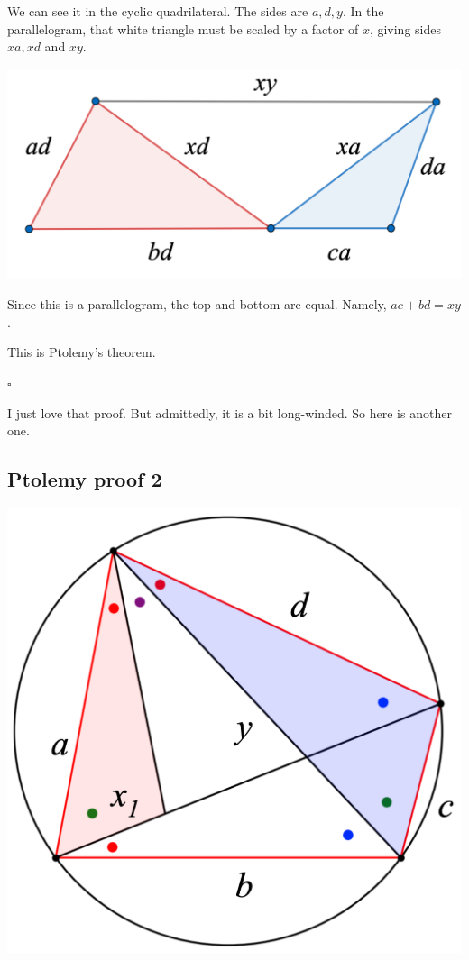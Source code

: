 \documentclass[11pt, oneside]{article}
\begin{document}
We can see it in the cyclic quadrilateral.  The sides are $a,d,y$.  In the parallelogram, that white triangle must be scaled by a factor of $x$, giving sides $xa, xd $ and $xy$.
\begin{center} \includegraphics [scale=0.2] {Ptol13.png} \end{center}

Since this is a parallelogram, the top and bottom are equal.  Namely, $ac + bd = xy$.

This is Ptolemy's theorem.

$\square$

I just love that proof.  But admittedly, it is a bit long-winded.  So here is another one.

\subsection*{Ptolemy proof 2}

\begin{center} \includegraphics [scale=0.25] {ptolemy_angles1.png} \end{center}
\end{document}
